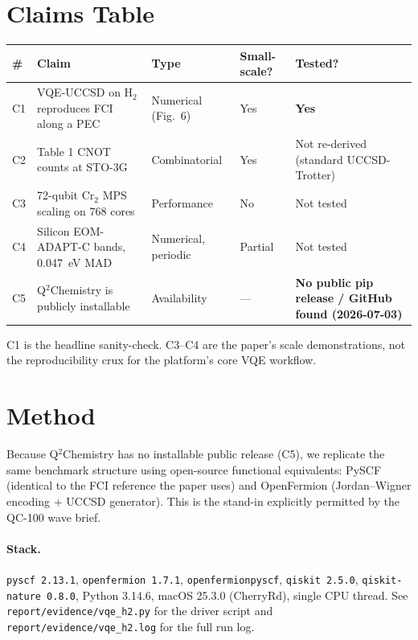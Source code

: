 \documentclass[11pt]{article}
\begin{document}
\section{Claims Table}
\begin{longtable}{@{}p{}p{}p{}p{}p{}@{}}
\toprule
\# & Claim & Type & Small-scale? & Tested? \\ \midrule
C1 & VQE-UCCSD on H$_2$ reproduces FCI along a PEC & Numerical (Fig.~6) & Yes & \textbf{Yes} \\
C2 & Table 1 CNOT counts at STO-3G & Combinatorial & Yes & Not re-derived (standard UCCSD-Trotter) \\
C3 & 72-qubit Cr$_2$ MPS scaling on 768 cores & Performance & No & Not tested \\
C4 & Silicon EOM-ADAPT-C bands, 0.047~eV MAD & Numerical, periodic & Partial & Not tested \\
C5 & Q$^2$Chemistry is publicly installable & Availability & --- & \textbf{No public pip release / GitHub found (2026-07-03)} \\
\bottomrule
\end{longtable}

C1 is the headline sanity-check. C3--C4 are the paper's scale
demonstrations, not the reproducibility crux for the platform's
core VQE workflow.

\section{Method}
Because Q$^2$Chemistry has no installable public release (C5), we
replicate the same benchmark structure using open-source functional
equivalents: PySCF (identical to the FCI reference the paper uses)
and OpenFermion (Jordan--Wigner encoding + UCCSD generator). This
is the stand-in explicitly permitted by the QC-100 wave brief.

\paragraph{Stack.} \texttt{pyscf 2.13.1}, \texttt{openfermion
1.7.1}, \texttt{openfermionpyscf}, \texttt{qiskit 2.5.0},
\texttt{qiskit-nature 0.8.0}, Python 3.14.6, macOS 25.3.0
(CherryRd), single CPU thread. See
\texttt{report/evidence/vqe\_h2.py} for the driver script and
\texttt{report/evidence/vqe\_h2.log} for the full run log.
\end{document}
